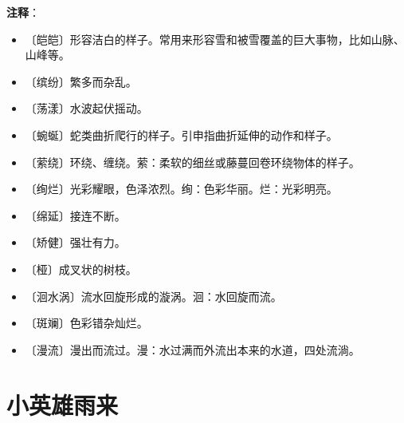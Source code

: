 \documentclass[12pt,UTF-8,openany]{ctexbook}
\begin{document}
\newpage

\textbf{注释}：

\vspace{-1em}

\begin{itemize}
    \setlength\itemsep{-0.2em}
    \item 〔皑皑〕形容洁白的样子。常用来形容雪和被雪覆盖的巨大事物，比如山脉、山峰等。
    \item 〔缤纷〕繁多而杂乱。
    \item 〔荡漾〕水波起伏摇动。
    \item 〔蜿蜒〕蛇类曲折爬行的样子。引申指曲折延伸的动作和样子。
    \item 〔萦绕〕环绕、缠绕。萦：柔软的细丝或藤蔓回卷环绕物体的样子。
    \item 〔绚烂〕光彩耀眼，色泽浓烈。绚：色彩华丽。烂：光彩明亮。
    \item 〔绵延〕接连不断。
    \item 〔矫健〕强壮有力。
    \item 〔桠〕成叉状的树枝。
    \item 〔洄水涡〕流水回旋形成的漩涡。洄：水回旋而流。
    \item 〔斑斓〕色彩错杂灿烂。
    \item 〔漫流〕漫出而流过。漫：水过满而外流出本来的水道，四处流淌。
\end{itemize}

\chapter{小英雄雨来}
\end{document}
